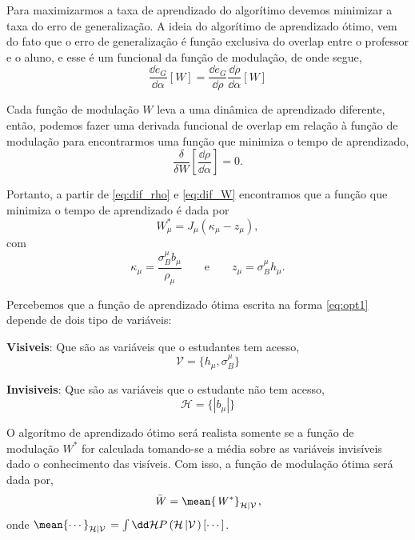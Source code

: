Para maximizarmos a taxa de aprendizado do algorítimo devemos
minimizar a taxa do erro de generalização. A ideia do algorítimo de
aprendizado ótimo\cite{Kinouchi1992}, vem do fato que o erro de generalização
é função exclusiva do overlap entre o professor e o aluno, e esse é um
funcional da função de modulação, de onde segue,
\[ 
    \frac{\dd e_G}{ \dd \alpha}\left[W\right]
        = \frac{\dd e_G}{ \dd \rho}\frac{\dd \rho}{ \dd \alpha}\left[W\right]
\]

Cada função de modulação $\mathit{W}$ leva a uma dinâmica de aprendizado
diferente, então, podemos fazer uma derivada funcional de overlap em relação à
função de modulação para encontrarmos uma função que minimiza o tempo
de aprendizado,
\begin{equation}
  \frac{\delta}{\delta \mathit{W}} \left[ \frac{\dd \rho}{ \dd \alpha} \right] 
  = 0. 
  \label{eq:dif_W}
\end{equation}

Portanto, a partir de  \eqref{eq:dif_rho} e \eqref{eq:dif_W} 
encontramos que a função que minimiza o tempo de aprendizado é dada por
\begin{equation}
  \mathit{W}_\mu^* = J_\mu \left( \kappa_\mu -z_\mu \right),
  \label{eq:opt1}
\end{equation}
com
\begin{equation}
  \kappa_\mu = \frac{\sigma_B^\mu b_\mu}{\rho_\mu} 
  \qquad \text{e} \qquad z_\mu = \sigma_B^\mu h_\mu .
\end{equation}

Percebemos que a função de aprendizado ótima escrita na forma
\eqref{eq:opt1} depende de dois tipo de variáveis:
\begin{description}
  \item \textbf{Visiveis}: Que são as variáveis que o estudantes tem acesso, 
   \[  
       \mathcal{V} = \{h_\mu , \sigma_B^\mu \}
   \]
  \item \textbf{Invisiveis}: Que são as variáveis que o estudante não tem
      acesso,
      \[
          \mathcal{H} = \{ \left|b_\mu\right| \}
      \]
\end{description}

O algorítmo de aprendizado ótimo será realista somente se a função
de modulação $\mathit{W}^*$ for calculada tomando-se a média sobre
as variáveis invisíveis dado o conhecimento das visíveis.  Com isso,
a função de modulação ótima será dada por,
\begin{equation}
  \bar{\mathit{W}}= \mean{\mathit{W}^*}_{\mathcal{H}\left|\mathcal{V}\right.},
  \label{eq:W_mean}
\end{equation} 
onde $\mean{\cdots}_{\mathcal{H}\left|\mathcal{V}\right.}
= \int \dd \mathcal{H} P \left(\mathcal{H}\left|
\mathcal{V}\right. \right)\left[\cdots\right]$. 

